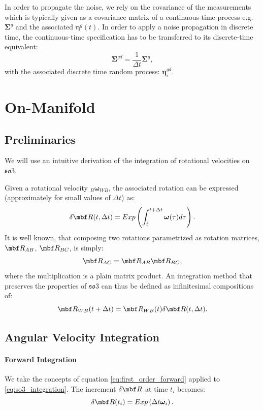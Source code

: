 \documentclass[10pt,a4paper]{article}
\newcommand{\mbs}[1]{{\boldsymbol{#1}}}
\numberwithin{equation}{section}
\begin{document}
In order to propagate the noise, we rely on the covariance of the measurements which is typically given as a covariance matrix of a continuous-time process e.g. $\mbs \Sigma^g$ and the associated $\mbs \eta^g(t)$. In order to apply a noise propagation in discrete time, the continuous-time specification has to be transferred to its discrete-time equivalent:
\begin{equation}
\mbs \Sigma^{gd} = \dfrac{1}{\Delta t} \mbs \Sigma^g,
\end{equation}
with the associated discrete time random process: $\mbs \eta^{gd}_i$.

\section{On-Manifold}

\subsection{Preliminaries}
We will use an intuitive derivation of the integration of rotational velocities on $\mathfrak{so}3$.

Given a rotational velocity $_B \mbs \omega_{WB}$, the associated rotation can be expressed (approximately for small values of $\Delta t$) as:
\begin{equation}
\delta \mbf R(t, \Delta t) = Exp \left( \int_t^{t + \Delta t} \mbs \omega(\tau) d\tau \right).
\end{equation}
It is well known, that composing two rotations parametrized as rotation matrices, $\mbf R_{AB}$, $\mbf R_{BC}$, is simply:
\begin{equation}
\mbf R_{AC} = \mbf R_{AB}\mbf R_{BC},
\end{equation}
where the multiplication is a plain matrix product.
An integration method that preserves the properties of $\mathfrak{so}3$ can thus be defined as infinitesimal compositions of:
\begin{equation}
\mbf R_{WB}(t + \Delta t) = \mbf R_{WB}(t) \delta \mbf R(t, \Delta t).
\label{eq:so3_integration}
\end{equation}

\subsection{Angular Velocity Integration}

\paragraph{Forward Integration}
We take the concepts of equation \eqref{eq:first_order_forward} applied to \eqref{eq:so3_integration}.
The increment $\delta \mbf R$ at time $t_i$ becomes:
\begin{equation}
\delta \mbf R(t_i) = Exp \left( \Delta t \mbs \omega_i\right).
\label{eq:manifold_forward}
\end{equation}
\end{document}

